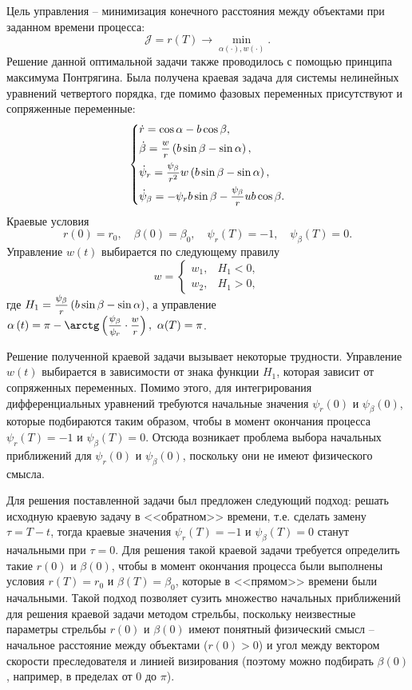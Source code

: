 \documentclass[a4paper,12pt, openany]{book}
\theoremstyle{plain} %
\theoremstyle{definition} %
\theoremstyle{remark} %
\numberwithin{equation}{chapter}
\begin{document}
{Цель управления -- минимизация конечного расстояния между объектами при заданном времени процесса:
$$
\mathcal{J} = r(T) \longrightarrow \mathop {\min }\limits_{\alpha(\cdot),w(\cdot)}.
$$
Решение данной оптимальной задачи также проводилось с помощью принципа максимума Понтрягина. Была получена краевая задача для системы нелинейных уравнений четвертого порядка, где помимо фазовых переменных присутствуют и сопряженные переменные:
$$
\left\{ {\begin{aligned}
   &\dot r = \cos \alpha  - b\cos \beta , \hfill  \\
   &\dot \beta  = \mfrac{w}
{r}\left( {b\sin \beta  - \sin \alpha } \right), \hfill  \\
   &\dot \psi _r  = \mfrac{{\psi _\beta  }}
{{r^2 }}w\left( {b\sin \beta  - \sin \alpha } \right), \hfill  \\
   &\dot \psi _\beta   =  - \psi _r b\sin \beta  - \mfrac{{\psi _\beta  }}
{r}ub\cos \beta . \hfill  \\
 \end{aligned} } \right.
$$
Краевые условия
$$
r\left( 0 \right) = r_0, \quad \beta \left( 0 \right) = \beta _0, \quad \psi _r \left( T \right) =  -1, \quad \psi _\beta  \left( T \right) = 0.
$$
Управление $w(t)$ выбирается по следующему правилу
$$
w = 
\begin{cases}
w_1, & H_1 < 0, \\
w_2, & H_1 > 0, 
\end{cases}
$$
где $H_1  = \mfrac{{\psi _\beta  }}
{r}\left( {b\sin \beta  - \sin \alpha } \right)$, а управление $\alpha \left( t \right) = \pi - \arctg\left( {\mfrac{{\psi _\beta  }}
{{\psi _r }} \cdot \mfrac{w}
{r}} \right), \,\, \alpha(T) = \pi$.

Решение полученной краевой задачи вызывает некоторые трудности. Управление $w(t)$ выбирается в зависимости от знака функции $H_1$, которая зависит от сопряженных переменных. Помимо этого, для интегрирования дифференциальных уравнений требуются начальные значения $\psi_r(0)$ и $\psi_{\beta}(0)$, которые подбираются таким образом, чтобы в момент окончания процесса  $\psi_r(T) = -1$ и $\psi_{\beta}(T) = 0$. Отсюда возникает проблема выбора начальных приближений для $\psi_r(0)$ и $\psi_{\beta}(0)$, поскольку они не имеют физического смысла.  

Для решения поставленной задачи был предложен следующий подход: решать исходную краевую задачу в <<обратном>> времени, т.е. сделать замену $\tau = T-t$, тогда краевые значения $\psi_r(T) = -1$ и $\psi_{\beta}(T) = 0$ станут начальными при $\tau = 0$. Для решения такой краевой задачи требуется определить такие $r(0)$ и $\beta(0)$, чтобы в момент окончания процесса были выполнены условия $r(T) = r_0$ и $\beta(T) = \beta_0$, которые в <<прямом>> времени были начальными. Такой подход позволяет сузить множество начальных приближений для решения краевой задачи методом стрельбы, поскольку неизвестные параметры стрельбы $r(0)$ и $\beta(0)$ имеют понятный физический смысл -- начальное расстояние между объектами ($r(0) > 0$) и угол между вектором скорости преследователя и линией визирования (поэтому можно подбирать $\beta(0)$, например, в пределах от $0$ до $\pi$).

}
\end{document}
